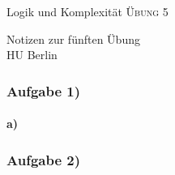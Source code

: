 \documentclass[12pt]{article}
\begin{document}
\begin{center}
\Large
Logik und Komplexität  \textsc{ Übung 5 }
\end{center}

\begin{flushright}
Notizen zur fünften Übung\\
HU Berlin \\

\vspace{2 mm}

\end{flushright}

\subsubsection*{Aufgabe 1)}
\paragraph*{a)}

\subsubsection*{Aufgabe 2)}
\end{document}
